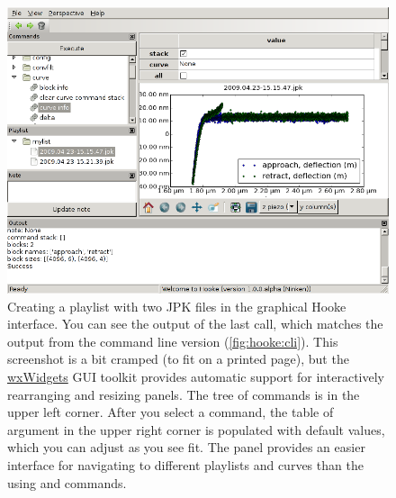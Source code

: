 \begin{figure}
  \begin{center}
    \includegraphics[width=\textwidth]{figures/binary/hooke-gui}
    \caption{Creating a playlist with two JPK files in the graphical
      Hooke interface.  You can see the output of the last  call, which matches the output from the command line
      version (\cref{fig:hooke:cli}).  This screenshot is a bit
      cramped (to fit on a printed page), but the
      \href{http://www.wxwidgets.org}{wxWidgets} GUI toolkit provides
      automatic support for interactively rearranging and resizing
      panels.  The tree of commands is in the upper left corner.
      After you select a command, the table of argument in the upper
      right corner is populated with default values, which you can
      adjust as you see fit.  The  panel provides an
      easier interface for navigating to different playlists and
      curves than the using  and  commands.\label{fig:hooke:gui}}
  \end{center}
\end{figure}
